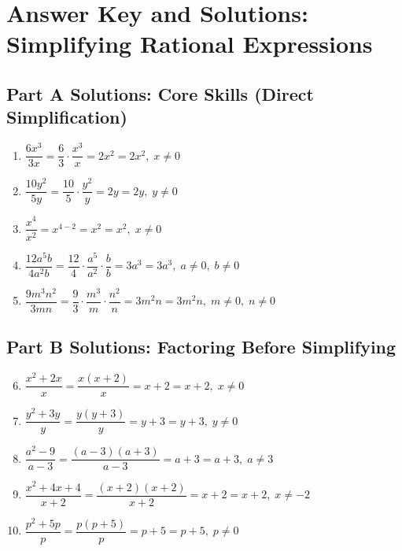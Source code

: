 \documentclass[12pt]{article}
\begin{document}
\newpage


\section*{Answer Key and Solutions: Simplifying Rational Expressions}

\subsection*{Part A Solutions: Core Skills (Direct Simplification)}
\begin{enumerate}
  \item \(\dfrac{6x^3}{3x}
  = \dfrac{6}{3} \cdot \dfrac{x^3}{x}
  = 2x^{2}
  = \boxed{2x^2}, \; x \ne 0\)

  \item \(\dfrac{10y^2}{5y}
  = \dfrac{10}{5} \cdot \dfrac{y^2}{y}
  = 2y
  = \boxed{2y}, \; y \ne 0\)

  \item \(\dfrac{x^4}{x^2}
  = x^{4-2}
  = x^2
  = \boxed{x^2}, \; x \ne 0\)

  \item \(\dfrac{12a^5 b}{4a^2 b}
  = \dfrac{12}{4} \cdot \dfrac{a^5}{a^2} \cdot \dfrac{b}{b}
  = 3a^{3}
  = \boxed{3a^3}, \; a \ne 0,\; b \ne 0\)

  \item \(\dfrac{9m^3 n^2}{3mn}
  = \dfrac{9}{3} \cdot \dfrac{m^3}{m} \cdot \dfrac{n^2}{n}
  = 3m^{2} n
  = \boxed{3m^2 n}, \; m \ne 0,\; n \ne 0\)
\end{enumerate}

\subsection*{Part B Solutions: Factoring Before Simplifying}
\begin{enumerate}
  \setcounter{enumi}{5}
  \item \(\dfrac{x^2 + 2x}{x}
  = \dfrac{x(x+2)}{x}
  = x+2
  = \boxed{x+2}, \; x \ne 0\)

  \item \(\dfrac{y^2 + 3y}{y}
  = \dfrac{y(y+3)}{y}
  = y+3
  = \boxed{y+3}, \; y \ne 0\)

  \item \(\dfrac{a^2 - 9}{a - 3}
  = \dfrac{(a-3)(a+3)}{a-3}
  = a+3
  = \boxed{a+3}, \; a \ne 3\)

  \item \(\dfrac{x^2 + 4x + 4}{x + 2}
  = \dfrac{(x+2)(x+2)}{x+2}
  = x+2
  = \boxed{x+2}, \; x \ne -2\)

  \item \(\dfrac{p^2 + 5p}{p}
  = \dfrac{p(p+5)}{p}
  = p+5
  = \boxed{p+5}, \; p \ne 0\)
\end{enumerate}
\end{document}
